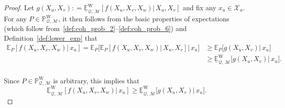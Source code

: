 \documentclass[10pt,a4paper]{paper}
\theoremstyle{definition}
\newcommand{\states}{\mathcal{X}}
\newcommand{\processes}{\mathbb{P}}
\newcommand{\wprocesses}{\processes^{\mathrm{W}}}
\newcommand{\rateset}{\mathcal{Q}}
\newcommand{\coloneqq}{:\!=}
\begin{document}
\theoremdecompositionmultivar*
\begin{proof}
Let $g(X_u,X_v)\coloneqq\underline{\mathbb{E}}^{\mathrm{W}}_{\rateset,\,\mathcal{M}}\left[f(X_u,X_v,X_w)\vert\,X_u,X_v\right]$ and fix any $x_u\in\states_u$.
For any $P\in\wprocesses_{\rateset,\,\mathcal{M}}$, it then follows from the basic properties of expectations (which follow from~\ref{def:coh_prob_2}--\ref{def:coh_prob_6}) and Definition~\ref{def:lower_exp} that
\begin{align*}
\mathbb{E}_P\left[f(X_u,X_v,X_w)\vert\,x_u\right] = \mathbb{E}_P\bigl[\mathbb{E}_P\left[f(X_u,X_v,X_w)\vert\,X_u,X_v\right]\vert\,x_u\bigr] 
 &\geq \mathbb{E}_P\bigl[g(X_u,X_v)\vert\,x_u\bigr] \\
 &\geq \underline{\mathbb{E}}^{\mathrm{W}}_{\rateset,\,\mathcal{M}}\bigl[g(X_u,X_v)\vert\,x_u\bigr].
\end{align*}\\[-20pt]
Since $P\in\wprocesses_{\rateset,\,\mathcal{M}}$ is arbitrary, this implies that
\begin{equation}\label{eq:theorem:decomposition_multivar:easyinequality}
\underline{\mathbb{E}}^{\mathrm{W}}_{\rateset,\,\mathcal{M}}\left[f(X_u,X_v,X_w)\vert\,x_u\right] \geq \underline{\mathbb{E}}^{\mathrm{W}}_{\rateset,\,\mathcal{M}}\bigl[g(X_u,X_v)\vert\,x_u\bigr].
\end{equation}


\end{proof}
\end{document}
